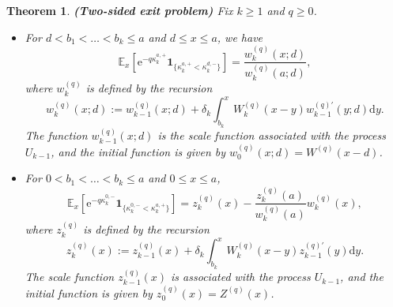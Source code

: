 \documentclass[12pt,reqno]{amsart}
\newcommand{\red}{\textcolor[rgb]{1.00,0.00,0.00}}
\newcommand{\blue}{\textcolor[rgb]{0.00,0.00,1.00}}
\newtheorem{theorem}{Theorem}
\theoremstyle{definition}
\theoremstyle{remark}
\newcommand{\e}{\mathbb{E}}
\newcommand{\ind}{\mathbf{1}}
\newcommand{\md}{\mathrm{d}}
\newcommand{\wq}{w^{(q)}}
\begin{document}
\begin{theorem}{\textbf{(Two-sided exit problem)}}
Fix $k \geq 1$ and $q \geq 0$. %
\begin{itemize}
\item[(i)]  For  $d < b_1<\dots< b_k\leq a$ and $d \leq x \leq a$, we have 
\begin{equation}\label{main_twosided_up}
\e_x \left[ \mathrm{e}^{-q \kappa_k^{a,+}} \ind_{\{\kappa_k^{a,+}< \kappa_k^{d,-}\}} \right] =\frac{\wq_k(x;d)}{\wq_k(a;d)},
\end{equation} 
where $\wq_k$ is defined by the recursion
\begin{equation}\label{eq:mr.recursion}
  \wq_k(x;d):= \wq_{k-1}(x;d)+\delta_{k}\int^{x}_{b_{k}}W_k^{\left(q\right)}(x-y)w_{k-1}^{(q)\prime}(y;d)\md y.
   \end{equation}
The function $\wq_{k-1}(x;d)$ is the scale function associated with the process $U_{k-1}$, and the initial function is given by $w_{0}^{\left(q\right)}(x;d)=W^{(q)}(x-d)$.
\item[(ii)] For $0 < b_1<\dots< b_k\leq a$ and $0 \leq x \leq a$,
	\begin{equation}\label{main_twosided_down}
	\e_x \left[ \mathrm{e}^{-q \kappa_k^{0,-}} \ind_{\{\kappa_k^{0,-}<\kappa_k^{a,+}\}} \right] =z_k^{(q)}(x)-\frac{z^{(q)}_k(a)}{\wq_k(a)}\wq_k(x),
	\end{equation}
	where $z^{(q)}_{k}$ is defined by the recursion
	\begin{equation}\label{eq:mr.recursion_z_q}
	z^{(q)}_{k}(x):=z^{(q)}_{k-1}(x)+\delta_{k}\int^{x}_{b_{k}}W_k^{\left(q\right)}(x-y)z_{k-1}^{\left(q\right)\prime}(y)\md y.
	\end{equation}
	The scale function $z^{(q)}_{k-1}(x)$ is associated with the process $U_{k-1}$, and the initial function is given by $z_{0}^{\left(q\right)}(x)=Z^{(q)}(x)$. %

\end{itemize}
\end{theorem}

%		
\end{document}
